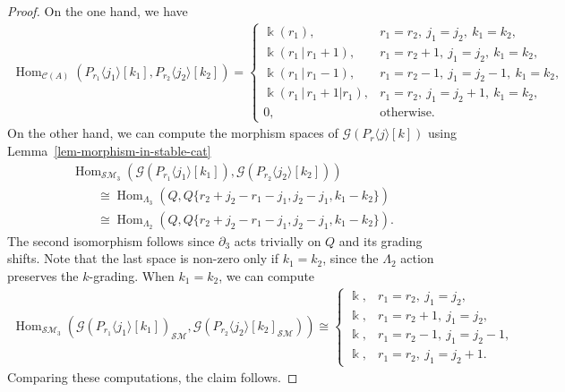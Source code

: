 \documentclass[pdftex]{sigma}
\theoremstyle{definition}
\numberwithin{equation}{section}
\newcommand{\Hom}{\operatorname{Hom}}
\def\dif{\partial}
\def\mc{\mathcal}
\begin{document}
\begin{proof}
On the one hand, we have
\begin{gather*}
 \Hom_{\mc{C}(A)} (P_{r_1}\langle j_1 \rangle[k_1], P_{r_2}\langle j_2 \rangle[k_2] )=
 \begin{cases}
 \Bbbk (r_1), & r_1=r_2,~j_1=j_2,~k_1=k_2,\\
 \Bbbk (r_1\,|\,r_1+1), & r_1=r_2+1,~j_1=j_2,~ k_1=k_2,\\
 \Bbbk (r_1\,|\,r_1-1), & r_1=r_2-1,~j_1=j_2-1,~k_1=k_2,\\
 \Bbbk (r_1\,|\,r_1+1|r_1), & r_1=r_2,~j_1=j_2+1,~ k_1=k_2,\\
 0, & \textrm{otherwise}.
 \end{cases}
\end{gather*}
On the other hand, we can compute the morphism spaces of $\mc{G}(P_r\langle j \rangle [k])$ using Lemma~\ref{lem-morphism-in-stable-cat}
\begin{gather*}
 \Hom_{\mc{SM}_3}\left(\mc{G}(P_{r_1}\langle j_1 \rangle[k_1]),\mc{G}( P_{r_2}\langle j_2 \rangle[k_2])\right) \\
 \qquad{} \cong \Hom_{\Lambda_3}(Q,Q\{r_2+j_2-r_1-j_1, j_2-j_1,k_1-k_2\}) \\
 \qquad{} \cong \Hom_{\Lambda_2}(Q,Q\{r_2+j_2-r_1-j_1, j_2-j_1,k_1-k_2\}).
\end{gather*}
The second isomorphism follows since $\dif_3$ acts trivially on $Q$ and its grading shifts. Note that the last space is non-zero only if $k_1=k_2$, since the $\Lambda_2$ action preserves the $k$-grading. When $k_1=k_2$, we can compute
\begin{gather*}
 \Hom_{\mc{SM}_3} (\mc{G}(P_{r_1}\langle j_1 \rangle[k_1])_{\mc{SM}},\mc{G}( P_{r_2}\langle j_2 \rangle[k_2]_{\mc{SM}}) ) \cong
 \begin{cases}
 \Bbbk, & r_1=r_2,~j_1=j_2,\\
 \Bbbk, & r_1=r_2+1,~j_1=j_2,\\
 \Bbbk, & r_1=r_2-1,~j_1=j_2-1,\\
 \Bbbk, & r_1=r_2,~j_1=j_2+1.
 \end{cases}
\end{gather*}
Comparing these computations, the claim follows.


\end{proof}
\end{document}
